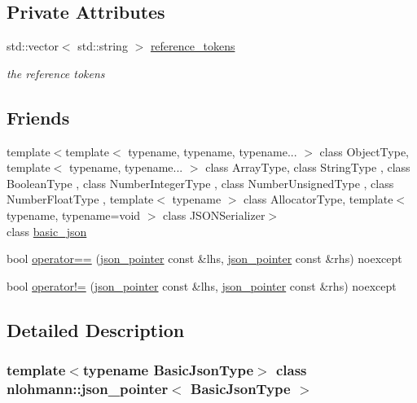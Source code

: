 \subsection*{Private Attributes}
\begin{DoxyCompactItemize}
\item 
std\+::vector$<$ std\+::string $>$ \hyperlink{classnlohmann_1_1json__pointer_a07a990a6838de4f38ee9d881e7b9fd61}{reference\+\_\+tokens}
\begin{DoxyCompactList}\small\item\em the reference tokens \end{DoxyCompactList}\end{DoxyCompactItemize}
\subsection*{Friends}
\begin{DoxyCompactItemize}
\item 
{\footnotesize template$<$template$<$ typename, typename, typename... $>$ class Object\+Type, template$<$ typename, typename... $>$ class Array\+Type, class String\+Type , class Boolean\+Type , class Number\+Integer\+Type , class Number\+Unsigned\+Type , class Number\+Float\+Type , template$<$ typename $>$ class Allocator\+Type, template$<$ typename, typename=void $>$ class J\+S\+O\+N\+Serializer$>$ }\\class \hyperlink{classnlohmann_1_1json__pointer_a95c261a91520bb66a51b6e142a9cf4b3}{basic\+\_\+json}
\item 
bool \hyperlink{classnlohmann_1_1json__pointer_a4667ef558c8c3f8a646bfda0c6654653}{operator==} (\hyperlink{classnlohmann_1_1json__pointer}{json\+\_\+pointer} const \&lhs, \hyperlink{classnlohmann_1_1json__pointer}{json\+\_\+pointer} const \&rhs) noexcept
\item 
bool \hyperlink{classnlohmann_1_1json__pointer_a6779edcf28e6f018a3bbb29c0b4b5e1e}{operator!=} (\hyperlink{classnlohmann_1_1json__pointer}{json\+\_\+pointer} const \&lhs, \hyperlink{classnlohmann_1_1json__pointer}{json\+\_\+pointer} const \&rhs) noexcept
\end{DoxyCompactItemize}


\subsection{Detailed Description}
\subsubsection*{template$<$typename Basic\+Json\+Type$>$\newline
class nlohmann\+::json\+\_\+pointer$<$ Basic\+Json\+Type $>$}

